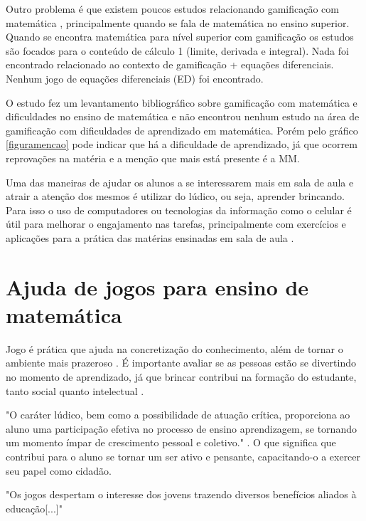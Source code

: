 Outro problema é que existem poucos estudos relacionando gamificação com matemática \cite{revbibmatgam}, principalmente quando se fala de matemática no ensino superior. Quando se encontra matemática para nível superior com gamificação os estudos são focados para o conteúdo de cálculo 1 (limite, derivada e integral). Nada foi encontrado relacionado ao contexto de gamificação + equações diferenciais. Nenhum jogo de equações diferenciais (ED) foi encontrado.

O estudo \cite{revbibmatgam} fez um levantamento bibliográfico sobre gamificação com matemática e dificuldades no ensino de matemática e não encontrou nenhum estudo na área de gamificação com dificuldades de aprendizado em matemática. Porém pelo gráfico \ref{figuramencao} pode indicar que há a dificuldade de aprendizado, já que ocorrem reprovações na matéria e a menção que mais está presente é a MM.

Uma das maneiras de ajudar os alunos a se interessarem mais em sala de aula e atrair a atenção dos mesmos é utilizar do lúdico, ou seja, aprender brincando. Para isso o uso de computadores ou tecnologias da informação como o celular é útil para melhorar o engajamento nas tarefas, principalmente com exercícios e aplicações para a prática das matérias ensinadas em sala de aula \cite{tdahNasEscolas2}.


\section[Ajuda de jogos para ensino de matemática]{Ajuda de jogos para ensino de matemática}
Jogo é prática que ajuda na concretização do conhecimento, além de tornar o ambiente mais prazeroso \cite{jogoPratPedagoc}. É importante avaliar se as pessoas estão se divertindo no momento de aprendizado, já que brincar contribui na formação do estudante, tanto social quanto intelectual \cite{jogoPratPedagoc}.

"O caráter lúdico, bem como a possibilidade de atuação crítica, proporciona ao aluno uma participação efetiva no processo de ensino aprendizagem, se tornando um momento ímpar de crescimento pessoal e coletivo."  \cite{jogoPratPedagoc}. O que significa que contribui para o aluno se tornar um ser ativo e pensante, capacitando-o a exercer seu papel como cidadão.

"Os jogos despertam o interesse dos jovens trazendo diversos benefícios aliados à
educação[...]" \cite{appcalculo}

\begin{comment}
Gamificação foca em elementos como desafios, níveis, avatar, conquistas, histórias, pontos (Gustavo Fortes Tondello, PhD). Esses elementos são utilizados para engajamento do jogador.

Completar missões e derrotar um chefão faz o jogador se sentir competente (Gustavo Fortes Tondello, PhD).
Ser capaz de escolher diferentes caminhos ou criar coisas diferentes faz o jogador se sentir autônomo (Gustavo Fortes Tondello, PhD).
\end{comment}


